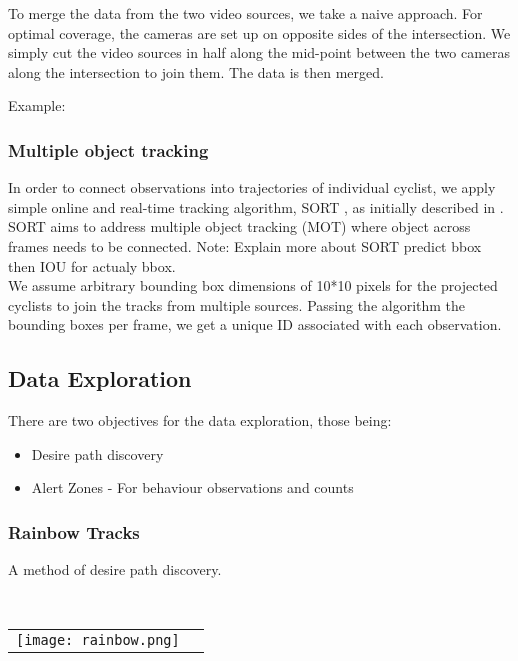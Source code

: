 To merge the data from the two video sources, we take a naive approach. For optimal coverage, the cameras are set up on
opposite sides of the intersection. We simply cut the video sources in half along the mid-point between
the two cameras along the intersection to join them. The data is then merged.

Example:

\subsubsection{Multiple object tracking}

In order to connect observations into trajectories of individual cyclist, we apply 
simple online and real-time tracking algorithm, SORT \cite{abewley_abewley/sort_2021}, as initially described in \cite{Bewley2016_sort}. 
SORT aims to address multiple object tracking (MOT) where object across frames needs to be connected. 
\color{red}
Note: Explain more about SORT predict bbox then IOU for actualy bbox.
\color{black}
\ \\
We assume arbitrary bounding box dimensions of 10*10 pixels for the projected cyclists to join the tracks from multiple sources. 
Passing the algorithm the bounding boxes per frame, we get a unique ID associated with each observation.

\subsection{Data Exploration}

There are two objectives for the data exploration, those being:
\begin{itemize}
	\item Desire path discovery
	\item Alert Zones - For behaviour observations and counts
\end{itemize}

\subsubsection{Rainbow Tracks}

A method of desire path discovery.

\ \\ 
\noindent
\begin{tabular}{@{}cc}
\texttt{[image: rainbow.png]} 
\end{tabular}
\label{Rainbow}
\ \\

